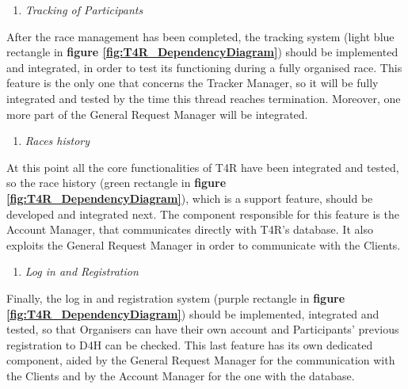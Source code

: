    \newpage
    \begin{enumerate} [resume]
        \item \emph{Tracking of Participants}
    \end{enumerate}
    After the race management has been completed, the tracking system (light blue rectangle in \textbf{figure \ref{fig:T4R_DependencyDiagram}}) should be implemented and integrated, in order to test its functioning during a fully organised race. This feature is the only one that concerns the Tracker Manager, so it will be fully integrated and tested by the time this thread reaches termination. Moreover, one more part of the General Request Manager will be integrated.
    \\
    \begin{enumerate} [resume]
        \item \emph{Races history}
    \end{enumerate}
    At this point all the core functionalities of T4R have been integrated and tested, so the race history (green rectangle in \textbf{figure \ref{fig:T4R_DependencyDiagram}}), which is a support feature, should be developed and integrated next. The component responsible for this feature is the Account Manager, that communicates directly with T4R's database. It also exploits the General Request Manager in order to communicate with the Clients.
    
    \begin{enumerate} [resume]
        \item \emph{Log in and Registration}
    \end{enumerate}
    Finally, the log in and registration system (purple rectangle in \textbf{figure \ref{fig:T4R_DependencyDiagram}}) should be implemented, integrated and tested, so that Organisers can have their own account and Participants' previous registration to D4H can be checked. This last feature has its own dedicated component, aided by the General Request Manager for the communication with the Clients and by the Account Manager for the one with the database.
    
    
    
    
    
    
    
    
    
    
